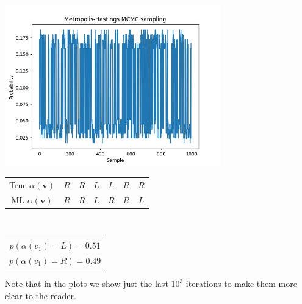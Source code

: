 \documentclass[]{article}
\begin{document}
	\begin{center}
		\includegraphics[height=7cm]{task3/V_6_T_6_N_10000.png}
		\begin{tabular}{| c | c | c | c | c | c | c |}
			True $\alpha(\mathbf{v})$ & $R$ & $R$ & $L$ & $L$ & $R$ & $R$ \\
			ML $\alpha(\mathbf{v})$ & $R$ & $R$ & $L$ & $R$ & $R$ & $L$ \\
		\end{tabular}
		\\
		\begin{tabular}{| c |}
			$p(\alpha(v_1)=L) = 0.51 $ \\
			$p(\alpha(v_1)=R) = 0.49 $ \\
		\end{tabular}
	\end{center}
	Note that in the plots we show just the last $10^3$ iterations to make them more clear to the reader. 
	
\end{document}
